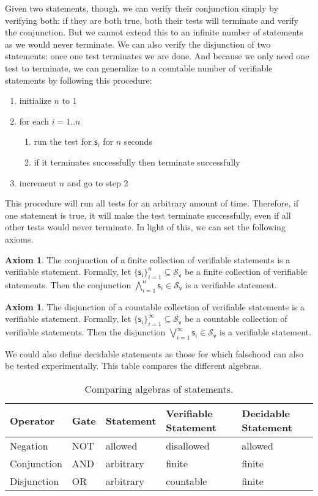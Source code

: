 \documentclass[letterpaper]{article}
\theoremstyle{plain}%
\theoremstyle{definition}
\newtheorem{axiom}[thrm]{Axiom}
\theoremstyle{remark}
\numberwithin{equation}{section}
\def\vstmtSet{\mathcal{S}_\textsf{v}}
\def\bigAND{\bigwedge}
\def\bigOR{\bigvee}
\newcommand{\stmt}[1][s] {\mathsf{#1}}
\begin{document}
Given two statements, though, we can verify their conjunction simply by verifying both: if they are both true, both their tests will terminate and verify the conjunction. But we cannot extend this to an infinite number of statements as we would never terminate. We can also verify the disjunction of two statements: once one test terminates we are done. And because we only need one test to terminate, we can generalize to a countable number of verifiable statements by following this procedure:
\begin{enumerate}
	\item initialize $n$ to 1
	\item for each $i=1..n$
	\begin{enumerate}
		\item run the test for $\stmt_i$ for $n$ seconds
		\item if it terminates successfully then terminate successfully
	\end{enumerate}
	\item increment $n$ and go to step 2
\end{enumerate}
This procedure will run all tests for an arbitrary amount of time. Therefore, if one statement is true, it will make the test terminate successfully, even if all other tests would never terminate. In light of this, we can set the following axioms.

\begin{axiom}\label{ax_verifiable_AND}
	The conjunction of a finite collection of verifiable statements is a verifiable statement. Formally, let $\{\stmt_i\}_{i=1}^{n} \subseteq \vstmtSet$ be a finite collection of verifiable statements. Then the conjunction $\bigAND\limits_{i=1}^{n} \stmt_i \in \vstmtSet$ is a verifiable statement.
\end{axiom}
	\begin{axiom}\label{ax_verifiable_OR}
	The disjunction of a countable collection of verifiable statements is a verifiable statement. Formally, let $\{\stmt_i\}_{i=1}^{\infty} \subseteq \vstmtSet$ be a countable collection of verifiable statements. Then the disjunction $\bigOR\limits_{i=1}^{\infty} \stmt_i \in \vstmtSet$ is a verifiable statement.
\end{axiom}

We could also define decidable statements as those for which falsehood can also be tested experimentally. This table compares the different algebras.

\begin{table}[h]
	\centering
	\begin{tabular}{p{} p{} p{} p{} p{}}
		Operator & Gate & Statement & Verifiable Statement & Decidable Statement  \\ 
		\hline 
		Negation & NOT & allowed & disallowed & allowed \\ 
		Conjunction & AND & arbitrary  & finite & finite \\ 
		Disjunction & OR & arbitrary  & countable & finite \\ 
	\end{tabular}
	\caption{Comparing algebras of statements.}
\end{table}
\end{document}
